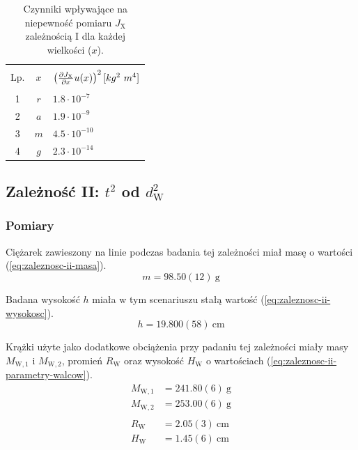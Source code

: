 \documentclass[twocolumn, a4paper, polish, 10pt]{article}
\newcommand{\JX}{\ensuremath{ J_{\mathrm{X}} }}
\newcommand{\dwSq}{\ensuremath{ d_{\mathrm{W}}^2 }}
\begin{document}
\begin{table}[ht]
\begin{center}
\renewcommand*{\tablename}{Tabela}
\caption{\small Czynniki wpływające na niepewność pomiaru $\JX$ zależnością I dla każdej wielkości ($x$).\vspace{0.15cm}
    \label{tab:zaleznosc-i-niepewnosci}}
    {\small
    \begin{tabular}{c c l}
    \hline \vspace{-0.35cm} \\
      Lp.
      & $x$
      & $\left( \pdv{\JX}{x} u(x) \right)^2 [kg^2~m^4]$ \\ 
      \hline \vspace{-0.2cm} \\
     1 & $r$ & $1.8 \cdot 10^{-7}$ \\
     2 & $a$ & $1.9 \cdot 10^{-9}$ \\
     3 & $m$ & $4.5 \cdot 10^{-10}$ \\
     4 & $g$ & $2.3 \cdot 10^{-14}$ \\
    \hline
    \end{tabular}}
    \end{center}
\end{table}

\subsection{Zależność II: \texorpdfstring{$t^2$}{t²} od \texorpdfstring{$\dwSq$}{dw²}}
\subsubsection{Pomiary}
Ciężarek zawieszony na linie podczas badania tej zależności miał masę o wartości (\ref{eq:zaleznosc-ii-masa}).
\begin{equation}
    m = 98.50(12)~\mathrm{g}
    \label{eq:zaleznosc-ii-masa}
\end{equation}

Badana wysokość $h$ miała w tym scenariuszu stałą wartość (\ref{eq:zaleznosc-ii-wysokosc}).
\begin{equation}
    h = 19.800(58)~\mathrm{cm}
    \label{eq:zaleznosc-ii-wysokosc}
\end{equation}

Krążki użyte jako dodatkowe obciążenia przy padaniu tej zależności miały masy $M_{\mathrm{W,1}}$ i $M_{\mathrm{W,2}}$, promień $R_{\mathrm{W}}$ oraz wysokość $H_{\mathrm{W}}$ o wartościach (\ref{eq:zaleznosc-ii-parametry-walcow}).
\begin{equation}
\begin{split}
    M_{\mathrm{W,1}} &= 241.80(6)~\mathrm{g} \\
    M_{\mathrm{W,2}} &= 253.00(6)~\mathrm{g} \\ \\
    R_{\mathrm{W}}   &= 2.05(3)~\mathrm{cm} \\
    H_{\mathrm{W}}   &= 1.45(6)~\mathrm{cm}
    \label{eq:zaleznosc-ii-parametry-walcow}
\end{split}
\end{equation}
\end{document}
